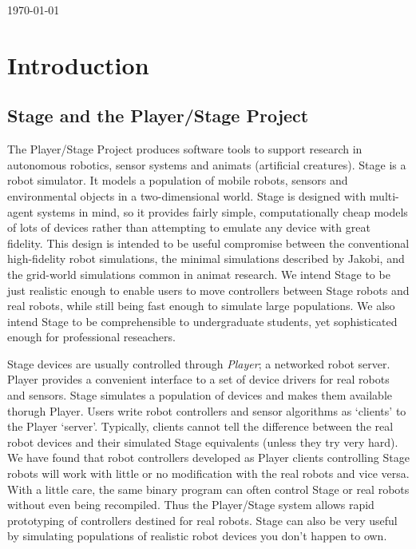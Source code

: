 \documentclass[letter,11pt,twoside]{report}
\begin{document}
  \vspace{4cm}

 \centerline{\today}

\tableofcontents


\setcounter{page}{0}


\chapter{Introduction}

\section{ Stage and the Player/Stage Project}

The Player/Stage Project produces software tools to support research
in autonomous robotics, sensor systems and animats (artificial
creatures). Stage is a robot simulator. It models a population of
mobile robots, sensors and environmental objects in a two-dimensional
world. Stage is designed with multi-agent systems in mind, so it
provides fairly simple, computationally cheap models of lots of
devices rather than attempting to emulate any device with great
fidelity. This design is intended to be useful compromise between the
conventional high-fidelity robot simulations, the minimal simulations
described by Jakobi\cite{jakobi:radical}, and the grid-world
simulations common in animat research\cite{wilson:animat}. We intend
Stage to be just realistic enough to enable users to move controllers
between Stage robots and real robots, while still being fast enough to
simulate large populations. We also intend Stage to be comprehensible
to undergraduate students, yet sophisticated enough for professional
reseachers.

Stage devices are usually controlled through \emph{Player}; a
networked robot server. Player provides a convenient interface to a
set of device drivers for real robots and sensors. Stage simulates a
population of devices and makes them available thorugh Player. Users
write robot controllers and sensor algorithms as `clients' to the
Player `server'. Typically, clients cannot tell the difference between
the real robot devices and their simulated Stage equivalents (unless
they try very hard). We have found that robot controllers developed as
Player clients controlling Stage robots will work with little or no
modification with the real robots and vice versa. With a little care,
the same binary program can often control Stage or real robots without
even being recompiled. Thus the Player/Stage system allows rapid
prototyping of controllers destined for real robots. Stage can also be
very useful by simulating populations of realistic robot devices you
don't happen to own.
  
\end{document}

